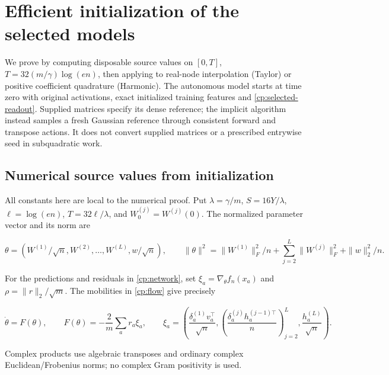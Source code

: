 \section{Efficient initialization of the selected models}
\label{cp:init:proof}

We prove  by computing disposable source values
on $[0,T]$, $T=32(m/\gamma)\log(en)$, then applying 
to real-node interpolation (Taylor) or positive coefficient quadrature
(Harmonic). The autonomous model starts at time zero with original
activations, exact initialized training features and
\eqref{cp:selected-readout}. Supplied matrices specify its dense reference;
the implicit algorithm instead samples a fresh Gaussian reference through
consistent forward and transpose actions. It does not convert supplied
matrices or a prescribed entrywise seed in subquadratic work.

\subsection{Numerical source values from initialization}
\label{cp:init:sec:numerics}

All constants here are local to the numerical proof. Put $\lambda=\gamma/m$, $S=16Y/\lambda$,
$\ell=\log(en)$, $T=32\ell/\lambda$, and $W_0^{(j)}=W^{(j)}(0)$.
The normalized parameter vector and its norm are

\[
\theta=(W^{(1)}/\sqrt n,W^{(2)},\ldots,W^{(L)},w/\sqrt n),
\qquad
\|\theta\|^2=\|W^{(1)}\|_F^2/n+
 \sum_{j=2}^L\|W^{(j)}\|_F^2+\|w\|_2^2/n.
\]

For the predictions and residuals in \eqref{cp:network}, set
$\xi_a=\nabla_\theta f_n(x_a)$ and
$\rho=\|r\|_2/\sqrt m$. The mobilities in
\eqref{cp:flow} give precisely

\begin{equation}
\label{cp:init:eq:field}
\dot\theta=F(\theta),\qquad
F(\theta)=-\frac2m\sum_a r_a\xi_a,\qquad
\xi_a=\left(\frac{\delta_a^{(1)}v_a^\top}{\sqrt n},
 \left(\frac{\delta_a^{(j)}h_a^{(j-1)\top}}n\right)_{j=2}^L,
 \frac{h_a^{(L)}}{\sqrt n}\right).
\end{equation}

Complex products use algebraic transposes and ordinary complex
Euclidean/Frobenius norms; no complex Gram positivity is used.

